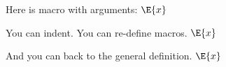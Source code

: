 \documentclass[a4paper]{article}
\begin{document}

Here is macro with arguments: $\E{x}$

  You can indent. You can re-define macros.
  $\E{x}$

And you can back to the general definition. $\E{x}$

\end{document}
